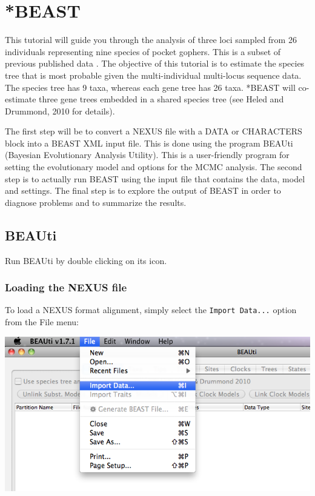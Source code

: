 \documentclass[12pt]{article}
\begin{document}

\section*{*BEAST}

This tutorial will guide you through the analysis of three loci sampled from 26 individuals representing nine species of pocket gophers. This is a subset of previous published data \cite{belfiore2008multilocus}. The objective of this tutorial is to estimate the species tree that is most probable given the multi-individual multi-locus sequence data. The species tree has 9 taxa, whereas each gene tree has 26 taxa. *BEAST will co-estimate three gene trees embedded in a shared species tree (see Heled and Drummond, 2010 for details).

The first step will be to convert a NEXUS file with a DATA or CHARACTERS block into a BEAST XML input file. This is done using the program BEAUti (Bayesian Evolutionary Analysis Utility). This is a user-friendly program for setting the evolutionary model and options for the MCMC analysis. The second step is to actually run BEAST using the input file that contains the data, model and settings. The final step is to explore the output of BEAST in order to diagnose problems and to summarize the results.

\subsection*{BEAUti}

Run BEAUti by double clicking on its icon. 

\subsubsection*{Loading the NEXUS file }

To load a NEXUS format alignment, simply select the \texttt{Import
Data...} option from the File menu: 

\medskip{}

\includegraphics[scale=0.5]{figures/ImportNexus}
\end{document}
